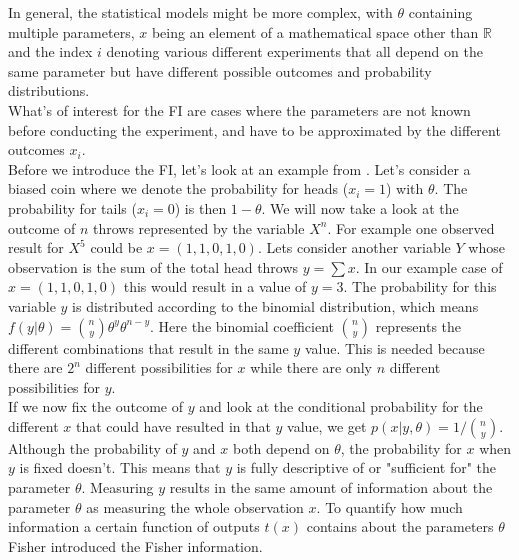 In general, the statistical models might be more complex, with $\theta$ containing multiple parameters, $x$ being an element of a mathematical space other than $\mathbb{R}$ and the index $i$ denoting various different experiments that all depend on the same parameter but have different possible outcomes and probability distributions.\\
What's of interest for the FI are cases where the parameters are not known before conducting the experiment, and have to be approximated by the different outcomes $x_i$.\\
Before we introduce the FI, let's look at an example from \cite{StatisticFisherInfoTutorial}. Let's consider a biased coin where we denote the probability for heads ($x_i = 1$) with $\theta$. The probability for tails ($x_i = 0$) is then $1-\theta$. We will now take a look at the outcome of $n$ throws represented by the variable $X^n$. For example one observed result for $X^5$ could be $x = (1,1,0,1,0)$. Lets consider another variable $Y$ whose observation is the sum of the total head throws $y = \sum x$. In our example case of $x = (1,1,0,1,0)$ this would result in a value of $y = 3$. The probability for this variable $y$ is distributed according to the binomial distribution, which means $f(y|\theta) = \binom{n}{y}\theta^y \theta^{n-y}$. Here the binomial coefficient $\binom{n}{y}$ represents the different combinations that result in the same $y$ value. This is needed because there are $2^n$ different possibilities for $x$ while there are only $n$ different possibilities for $y$.\\
If we now fix the outcome of $y$ and look at the conditional probability for the different $x$ that could have resulted in that $y$ value, we get $p(x|y,\theta) = 1/ \binom{n}{y}$. Although the probability of $y$ and $x$ both depend on $\theta$, the probability for $x$ when $y$ is fixed doesn't. This means that $y$ is fully descriptive of or "sufficient for" the parameter $\theta$. Measuring $y$ results in the same amount of information about the parameter $\theta$ as measuring the whole observation $x$. To quantify how much information a certain function of outputs $t(x)$ contains about the parameters $\theta$ Fisher introduced the Fisher information.\\
